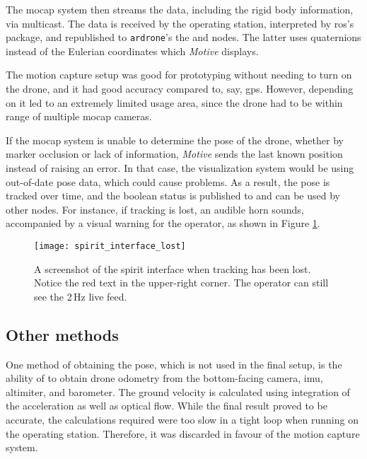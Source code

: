 
    The \gls{mocap} system then streams the data, including the rigid body information, via multicast.
    The data is received by the operating station, interpreted by \gls{ros}'s \texttt{} package, and republished to \texttt{ardrone}'s the \texttt{} and \texttt{} nodes.
    The latter uses quaternions instead of the Eulerian coordinates which \emph{Motive} displays.

    The motion capture setup was good for prototyping without needing to turn on the drone, and it had good accuracy compared to, say, \gls{gps}.
    However, depending on it led to an extremely limited usage area, since the drone had to be within range of multiple \gls{mocap} cameras.

    If the \gls{mocap} system is unable to determine the pose of the drone, whether by marker occlusion or lack of information, \emph{Motive} sends the last known position instead of raising an error.
    In that case, the visualization system would be using out-of-date pose data, which could cause problems.
    As a result, the pose is tracked over time, and the boolean status is published to \texttt{} and can be used by other nodes.
    For instance, if tracking is lost, an audible horn sounds, accompanied by a visual warning for the operator, as shown in Figure \ref{fig:spirit_interface_lost}.

    \begin{figure}[h]
      \centering
      \texttt{[image: spirit\_interface\_lost]}
      \caption[Interface with tracking lost]{A screenshot of the \gls{spirit} interface when tracking has been lost. Notice the red text in the upper-right corner. The operator can still see the 2\,Hz live feed.}
      \label{fig:spirit_interface_lost}
    \end{figure}

  \subsection{Other methods}
    One method of obtaining the pose, which is not used in the final setup, is the ability of \texttt{} to obtain drone odometry from the bottom-facing camera, \gls{imu}, altimiter, and barometer.
    The ground velocity is calculated using integration of the acceleration as well as optical flow.
    While the final result proved to be accurate, the calculations required were too slow in a tight loop when running on the operating station.
    Therefore, it was discarded in favour of the motion capture system.

